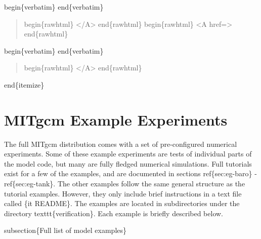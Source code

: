\documentclass[letterpaper,10pt,english]{sphinxmanual}
\begin{document}
begin\{verbatim\}
end\{verbatim\}
\begin{quote}

begin\{rawhtml\} \textless{}/A\textgreater{} end\{rawhtml\}
begin\{rawhtml\} \textless{}A href=\sphinxquotedblright{}\sphinxquotedblleft{}\textgreater{} end\{rawhtml\}
\end{quote}

begin\{verbatim\}
end\{verbatim\}
\begin{quote}

begin\{rawhtml\} \textless{}/A\textgreater{} end\{rawhtml\}
\end{quote}

end\{itemize\}


\chapter{MITgcm Example Experiments}
\label{\detokenize{examples/examples:mitgcm-example-experiments}}\label{\detokenize{examples/examples::doc}}\label{\detokenize{examples/examples:chap-modelexamples}}
The full MITgcm distribution comes with a set of pre-configured
numerical experiments.  Some of these example experiments are tests of
individual parts of the model code, but many are fully fledged
numerical simulations. Full tutorials exist for a few of the examples,
and are documented in sections ref\{sec:eg-baro\} -
ref\{sec:eg-tank\}. The other examples follow the same general
structure as the tutorial examples. However, they only include brief
instructions in a text file called \{it README\}.  The examples are
located in subdirectories under the directory texttt\{verification\}.
Each example is briefly described below.

subsection\{Full list of model examples\}
\end{document}
